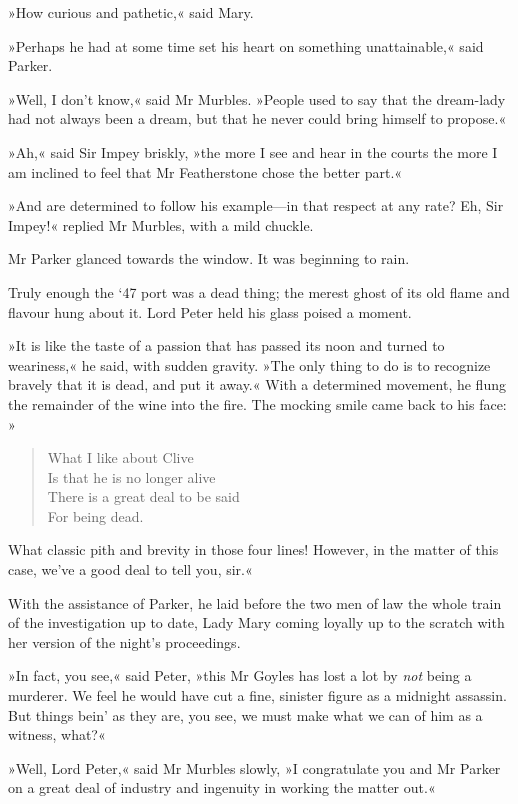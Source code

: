 »How curious and pathetic,« said Mary.

»Perhaps he had at some time set his heart on something unattainable,« said Parker.

»Well, I don't know,« said Mr Murbles. »People used to say that the dream-lady had not always been a dream, but that he never could bring himself to propose.«

»Ah,« said Sir Impey briskly, »the more I see and hear in the courts the more I am inclined to feel that Mr Featherstone chose the better part.«

»And are determined to follow his example—in that respect at any rate?  Eh, Sir Impey!« replied Mr Murbles, with a mild chuckle.

Mr Parker glanced towards the window. It was beginning to rain.

Truly enough the `47 port was a dead thing; the merest ghost of its old flame and flavour hung about it. Lord Peter held his glass poised a moment.

»It is like the taste of a passion that has passed its noon and turned to weariness,« he said, with sudden gravity. »The only thing to do is to recognize bravely that it is dead, and put it away.« With a determined movement, he flung the remainder of the wine into the fire.  The mocking smile came back to his face: 
»\begin{verse}
What I like about Clive\\
Is that he is no longer alive\longdash \\
There is a great deal to be said\\
For being dead.\\
\end{verse}

What classic pith and brevity in those four lines! However, in the matter of this case, we've a good deal to tell you, sir.«

With the assistance of Parker, he laid before the two men of law the whole train of the investigation up to date, Lady Mary coming loyally up to the scratch with her version of the night's proceedings.

»In fact, you see,« said Peter, »this Mr Goyles has lost a lot by \textit{not} being a murderer. We feel he would have cut a fine, sinister figure as a midnight assassin. But things bein' as they are, you see, we must make what we can of him as a witness, what?«

»Well, Lord Peter,« said Mr Murbles slowly, »I congratulate you and Mr Parker on a great deal of industry and ingenuity in working the matter out.«

